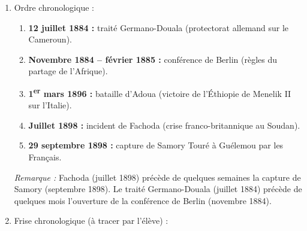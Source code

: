 \documentclass[11pt]{article}
\begin{document}
\begin{corrige}
\begin{enumerate}
    \item Ordre chronologique :
    \begin{enumerate}
        \item \textbf{12 juillet 1884 :} traité Germano-Douala (protectorat allemand sur le Cameroun).
        \item \textbf{Novembre 1884 – février 1885 :} conférence de Berlin (règles du partage de l'Afrique).
        \item \textbf{1\textsuperscript{er} mars 1896 :} bataille d'Adoua (victoire de l'Éthiopie de Menelik II sur l'Italie).
        \item \textbf{Juillet 1898 :} incident de Fachoda (crise franco-britannique au Soudan).
        \item \textbf{29 septembre 1898 :} capture de Samory Touré à Guélemou par les Français.
    \end{enumerate}
    \emph{Remarque :} Fachoda (juillet 1898) précède de quelques semaines la capture de Samory (septembre 1898). Le traité Germano-Douala (juillet 1884) précède de quelques mois l'ouverture de la conférence de Berlin (novembre 1884).
    \item Frise chronologique (à tracer par l'élève) :


\end{enumerate}
\end{corrige}
\end{document}

